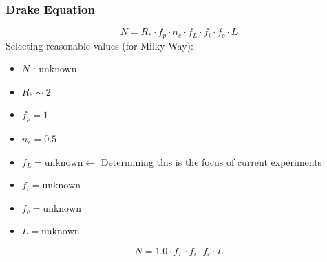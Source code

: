 \documentclass{beamer}
\begin{document}
\begin{frame}
\frametitle{Drake Equation}
$$ N = R_{*} \cdot f_{p} \cdot n_{e} \cdot f_{L} \cdot f_{i} \cdot f_{c} \cdot L$$
Selecting reasonable values (for Milky Way): 
\begin{itemize}
    \item $N$ : unknown
    \item $R_{*} \sim 2$
    \item $f_{p} = 1$
    \item $n_{e} = 0.5$ %
    \item $f_{L} = \text{unknown} \leftarrow $ Determining this is the focus of current experiments
    \item $f_{i} = \text{unknown}$
    \item $f_{c} = \text{unknown}$ 
    \item $L     = \text{unknown}$ 
\end{itemize}
\pause
$$ N = 1.0 \cdot f_{L} \cdot f_{i} \cdot f_{c} \cdot L$$
\end{frame}


\end{document}
